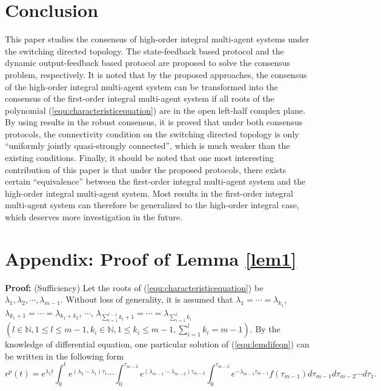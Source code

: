 \documentclass[12pt,draftcls,onecolumn]{IEEEtran}
\begin{document}
\section{Conclusion}\label{Conclusion}
This paper studies the consensus of high-order integral multi-agent systems under the switching directed topology. The state-feedback based protocol and the dynamic output-feedback based protocol are proposed to solve the consensus problem, respectively. It is noted that by the proposed approaches, the consensus of the high-order integral multi-agent system can be transformed into the consensus of the first-order integral multi-agent system if all roots of the polynomial (\ref{equ:characteristicequation}) are in the open left-half complex plane. By using results in the robust consensus, it is proved that under both consensus protocols, the connectivity condition on the switching directed topology is only ``uniformly jointly quasi-strongly connected'', which is much weaker than the existing conditions. Finally, it should be noted that one most interesting contribution of this paper is that under the proposed protocols, there exists certain ``equivalence'' between the first-order integral multi-agent system and the high-order integral multi-agent system. Most results in the first-order integral multi-agent system can therefore be generalized to the high-order integral case, which deserves more investigation in the future.





\section*{Appendix: Proof of Lemma \ref{lem1}}
\textbf{Proof:} (Sufficiency) Let the roots of (\ref{equ:characteristicequation}) be $\lambda_1, \lambda_2, \cdots, \lambda_{m-1}$. Without loss of generality, it is assumed that $\lambda_1 = \cdots = \lambda_{k_1}$, $\lambda_{k_1+1} = \cdots = \lambda_{k_1+k_2}$, $\cdots$, $\lambda_{\sum^{l-1}_{i=1}k_i+1} = \cdots = \lambda_{\sum^{l}_{i=1}k_i}$ $(l \in \mathbb{N}, 1 \leq l \leq m-1, k_i \in \mathbb{N}, 1 \leq k_i \leq m-1, \sum^l_{i=1}k_i = m-1)$. By the knowledge of differential equation, one particular solution of (\ref{equ:lemdifeqn}) can be written in the following form
\begin{equation}\label{equ:particularsolution}
r^p(t) = e^{\lambda_1 t}\int^t_0e^{(\lambda_2-\lambda_1)\tau_1}\cdots\int^{\tau_{m-3}}_0e^{(\lambda_{m-1}-\lambda_{m-2})\tau_{m-2}}\int^{\tau_{m-2}}_0e^{-\lambda_{m-1}\tau_{m-1}}f(\tau_{m-1})d\tau_{m-1}d\tau_{m-2}\cdots d\tau_1.
\end{equation}
\end{document}
